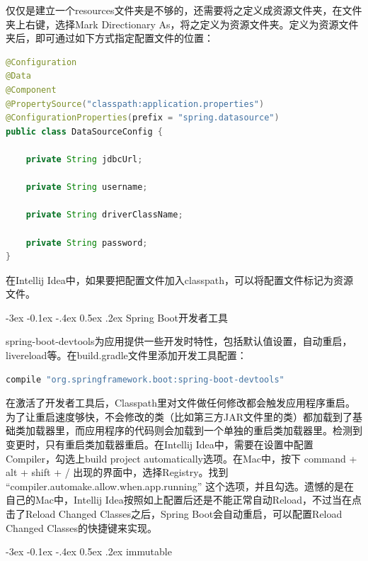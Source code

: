 \documentclass[12pt]{book}
\makeatletter
\numberwithin{dummy}{section}
\theoremstyle{ocrenumbox}
\theoremstyle{blacknumex}
\theoremstyle{blacknumbox}
\theoremstyle{ocrenum}
\renewcommand{\subsection}{\@startsection {subsection}{2}{\z@}
	{-3ex \@plus -0.1ex \@minus -.4ex}
	{0.5ex \@plus.2ex }
	{\normalfont\sffamily\bfseries}}
\makeatother
\begin{document}
仅仅是建立一个resources文件夹是不够的，还需要将之定义成资源文件夹，在文件夹上右键，选择Mark Directionary As，将之定义为资源文件夹。定义为资源文件夹后，即可通过如下方式指定配置文件的位置：

\begin{lstlisting}[language=Java]
@Configuration
@Data
@Component
@PropertySource("classpath:application.properties")
@ConfigurationProperties(prefix = "spring.datasource")
public class DataSourceConfig {

	private String jdbcUrl;
	
	private String username;
	
	private String driverClassName;
	
	private String password;
}
\end{lstlisting}

在Intellij Idea中，如果要把配置文件加入classpath，可以将配置文件标记为资源文件。

\subsection{Spring Boot开发者工具}

spring-boot-devtools为应用提供一些开发时特性，包括默认值设置，自动重启，livereload等。在build.gradle文件里添加开发工具配置：

\begin{lstlisting}[language=Bash]
compile "org.springframework.boot:spring-boot-devtools"
\end{lstlisting}

在激活了开发者工具后，Classpath里对文件做任何修改都会触发应用程序重启。为了让重启速度够快，不会修改的类（比如第三方JAR文件里的类）都加载到了基础类加载器里，而应用程序的代码则会加载到一个单独的重启类加载器里。检测到变更时，只有重启类加载器重启。在Intellij Idea中，需要在设置中配置Compiler，勾选上build project automatically选项。在Mac中，按下 command + alt + shift + / 出现的界面中，选择Registry。找到 “compiler.automake.allow.when.app.running” 这个选项，并且勾选。遗憾的是在自己的Mac中，Intellij Idea按照如上配置后还是不能正常自动Reload，不过当在点击了Reload Changed Classes之后，Spring Boot会自动重启，可以配置Reload Changed Classes的快捷键来实现。

\subsection{immutable}
\end{document}
